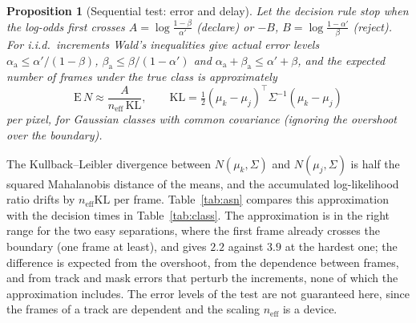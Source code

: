 \documentclass[11pt,a4paper]{article}
\newtheorem{proposition}{Proposition}
\theoremstyle{definition}
\begin{document}
\begin{proposition}[Sequential test: error and delay]\label{prop:wald}
Let the decision rule stop when the log-odds first crosses $A=\log\frac{1-\beta}{\alpha'}$ (declare) or $-B$, $B=\log\frac{1-\alpha'}{\beta}$ (reject). For i.i.d.\ increments Wald's inequalities give actual error levels $\alpha_{\mathrm a}\le\alpha'/(1-\beta)$, $\beta_{\mathrm a}\le\beta/(1-\alpha')$ and $\alpha_{\mathrm a}+\beta_{\mathrm a}\le\alpha'+\beta$, and the expected number of frames under the true class is approximately
\[
\mathrm{E}\,N\approx\frac{A}{n_{\mathrm{eff}}\,\mathrm{KL}},\qquad \mathrm{KL}=\tfrac12(\mu_k-\mu_j)^{\top}\Sigma^{-1}(\mu_k-\mu_j)
\]
per pixel, for Gaussian classes with common covariance (ignoring the overshoot over the boundary).
\end{proposition}
The Kullback--Leibler divergence between $N(\mu_k,\Sigma)$ and $N(\mu_j,\Sigma)$ is half the squared Mahalanobis distance of the means, and the accumulated log-likelihood ratio drifts by $n_{\mathrm{eff}}\mathrm{KL}$ per frame. Table~\ref{tab:asn} compares this approximation with the decision times in Table~\ref{tab:class}. The approximation is in the right range for the two easy separations, where the first frame already crosses the boundary (one frame at least), and gives $2.2$ against $3.9$ at the hardest one; the difference is expected from the overshoot, from the dependence between frames, and from track and mask errors that perturb the increments, none of which the approximation includes. The error levels of the test are not guaranteed here, since the frames of a track are dependent and the scaling $n_{\mathrm{eff}}$ is a device.

\begin{table}[t]
\centering\small
\resizebox{\textwidth}{!}{}
\caption{Predicted expected decision time of the sequential test, $\max\{1,A/(n_{\mathrm{eff}}\mathrm{KL})\}$ with the KL of the closest pair of classes, against the observed mean number of frames (Table~\ref{tab:class}). Per-pixel colour sd is $22$, $n_{\mathrm{eff}}=20$, $A=\log 99$.}
\label{tab:asn}
\end{table}
\end{document}
